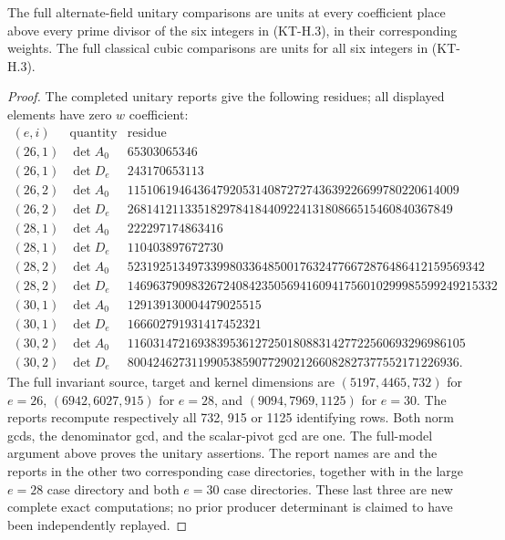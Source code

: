 \begin{proposition}
The full alternate-field unitary comparisons are units at every
coefficient place above every prime divisor of the six
integers in (KT-H.3), in their corresponding weights.
The full classical cubic comparisons are units for all six
integers in (KT-H.3).
\end{proposition}
\begin{proof}
The completed unitary reports give the following residues;
all displayed elements have zero $w$ coefficient:
\[
\begin{array}{c|c|r}
(e,i)&\text{quantity}&\text{residue}\\\hline
(26,1)&\det A_0&65303065346\\
(26,1)&\det D_e&243170653113\\
(26,2)&\det A_0&1151061946436479205314087272743639226699780220614009\\
(26,2)&\det D_e&268141211335182978418440922413180866515460840367849\\
(28,1)&\det A_0&222297174863416\\
(28,1)&\det D_e&110403897672730\\
(28,2)&\det A_0&52319251349733998033648500176324776672876486412159569342\\
(28,2)&\det D_e&1469637909832672408423505694160941756010299985599249215332\\
(30,1)&\det A_0&129139130004479025515\\
(30,1)&\det D_e&166602791931417452321\\
(30,2)&\det A_0&11603147216938395361272501808831427722560693296986105\\
(30,2)&\det D_e&8004246273119905385907729021266082827377552171226936.
\end{array}                                             \tag{KT-H.4}
\]
The full invariant source, target and kernel dimensions are
$(5197,4465,732)$ for $e=26$, $(6942,6027,915)$ for $e=28$,
and $(9094,7969,1125)$ for $e=30$.
The reports recompute respectively all 732, 915 or 1125 identifying
rows.  Both norm gcds, the denominator gcd, and the scalar-pivot
gcd are one.  The full-model argument above proves the unitary
assertions.  The report names are
 and the
 reports in the other
two corresponding case directories, together with
 in the large $e=28$ case directory
and both $e=30$ case directories.  These last three are new
complete exact computations; no prior producer determinant is
claimed to have been independently replayed.


\end{proof}
